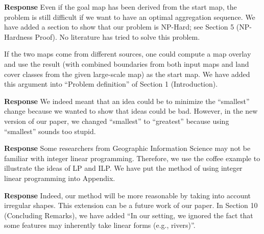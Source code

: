 \documentclass[a4paper,twoside,11pt]{reviewresponse}
\begin{document}
\textbf{Response}
Even if the goal map has been derived from the start map,
the problem is still difficult if we want to have an optimal aggregation sequence.
We have added a section to show that our problem is NP-Hard;
see Section 5 (NP-Hardness Proof).
No literature has tried to solve this problem.

If the two maps come from different sources, one could compute a map overlay and use the result (with combined boundaries from both input maps and land cover classes from the given large-scale map) as the start map.
We have added this argument into ``Problem definition''
of Section 1 (Introduction).



\textbf{Response} We indeed meant that 
an idea could be to minimize the ``smallest'' change
because we wanted to show that ideas could be bad.
However, in the new version of our paper, we changed ``smallest''
to ``greatest'' because using ``smallest'' sounds too stupid.


\textbf{Response}
Some researchers from Geographic Information Science 
may not be familiar with integer linear programming.
Therefore, we use the coffee example to illustrate the ideas of LP and ILP.
We have put the method of using integer linear programming into Appendix.



\textbf{Response}
Indeed, our method will be more reasonable 
by taking into account irregular shapes.
This extension can be a future work of our paper.
In Section 10 (Concluding Remarks),
we have added
``In our setting, we ignored the fact that
some features may inherently take linear forms
(e.g., rivers)''.

\clearpage
\end{document}
